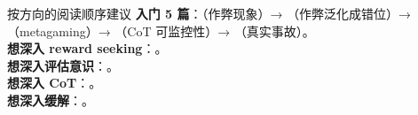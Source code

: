 \documentclass[11pt,a4paper]{ctexart}
\begin{document}
\begin{card}{按方向的阅读顺序建议}
\textbf{入门 5 篇}：\cite{metrrh}（作弊现象）→ \cite{naturalem}（作弊泛化成错位）→ \cite{metagaming}（metagaming）→ \cite{oaimon}（CoT 可监控性）→ \cite{hfopenai}（真实事故）。\\
\textbf{想深入 reward seeking}：\cite{toyreward,rsapollo,rsopenai,hackeropus,updateaware}。\\
\textbf{想深入评估意识}：\cite{vea,olmoeval,logitmon,auditreal,safedanger}。\\
\textbf{想深入 CoT}：\cite{metrinformative,cotcontrol,underelicit,earlyexit,nocoth,serialdepth}。\\
\textbf{想深入缓解}：\cite{inocant,graft,obfatlas,teachwhy,beneficial,selfreport}。
\end{card}

\newpage

\end{document}
